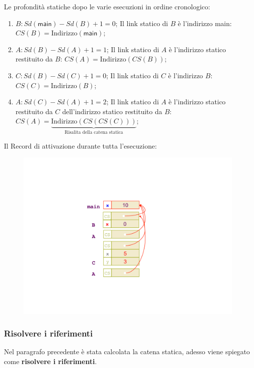 \documentclass[a4paper]{article}
\begin{document}
	\noindent
	Le profondità statiche dopo le varie esecuzioni in ordine cronologico:
	\begin{enumerate}
		\item $B: Sd\left(\textsf{main}\right) - Sd\left(B\right) + 1 = 0$;\newline
		Il link statico di $B$ è l'indirizzo \textsf{main}: $CS\left(B\right) = \text{Indirizzo}\left(\textsf{main}\right)$;
		
		\item $A: Sd\left(B\right) - Sd\left(A\right) + 1 = 1$;\newline
		Il link statico di $A$ è l'indirizzo statico restituito da $B$: $CS\left(A\right) = \text{Indirizzo}\left(CS\left(B\right)\right)$;
		
		\item $C: Sd\left(B\right) - Sd\left(C\right) + 1 = 0$;\newline
		Il link statico di $C$ è l'indirizzo $B$: $CS\left(C\right) = \text{Indirizzo}\left(B\right)$;

		\item $A: Sd\left(C\right) - Sd\left(A\right) + 1 = 2$;\newline
		Il link statico di $A$ è l'indirizzo statico restituito da $C$ dell'indirizzo statico restituito da $B$: $CS\left(A\right) = \underbrace{\text{Indirizzo}\left(CS\left(CS\left(C\right)\right)\right)}_{\text{Risalita della catena statica}}$;
	\end{enumerate}
	Il Record di attivazione durante tutta l'esecuzione:
	\begin{figure}[!htp]
		\centering
		\includegraphics[width=.3\textwidth]{img/link-statici-3.pdf}
	\end{figure}\newpage

	\subsubsection{Risolvere i riferimenti}
	Nel paragrafo precedente è stata calcolata la catena statica, adesso viene spiegato come \textbf{risolvere i riferimenti}.\newline
	
\end{document}
